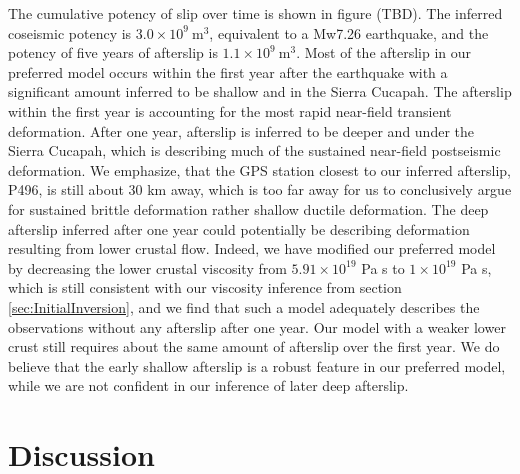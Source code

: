 \documentclass[1p]{elsarticle}
\begin{document}
The cumulative potency of slip over time is shown in figure (TBD). The inferred coseismic potency is $3.0\times10^{9}\ \mathrm{m}^3$, equivalent to a Mw7.26 earthquake, and the potency of five years of afterslip is $1.1\times10^{9}\ \mathrm{m}^3$. Most of the afterslip in our preferred model occurs within the first year after the earthquake with a significant amount inferred to be shallow and in the Sierra Cucapah.  The afterslip within the first year is accounting for the most rapid near-field transient deformation. After one year, afterslip is inferred to be deeper and under the Sierra Cucapah, which is describing much of the sustained near-field postseismic deformation.  We emphasize, that the GPS station closest to our inferred afterslip, P496, is still about 30 km away, which is too far away for us to conclusively argue for sustained brittle deformation rather shallow ductile deformation. The deep afterslip inferred after one year could potentially be describing deformation resulting from lower crustal flow.  Indeed, we have modified our preferred model by decreasing the lower crustal viscosity from $5.91\times10^{19}$ Pa s to $1\times10^{19}$ Pa s, which is still consistent with our viscosity inference from section \ref{sec:InitialInversion}, and we find that such a model adequately describes the observations without any afterslip after one year. Our model with a weaker lower crust still requires about the same amount of afterslip over the first year. We do believe that the early shallow afterslip is a robust feature in our preferred model, while we are not confident in our inference of later deep afterslip.                   
  
\section{Discussion}
\end{document}
